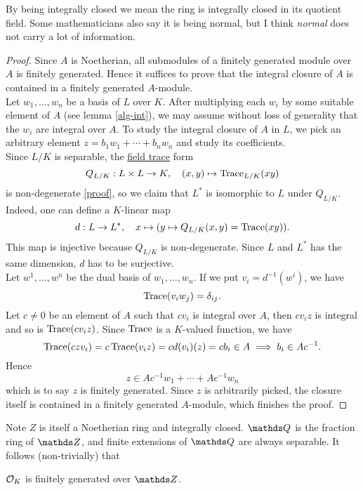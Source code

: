 			By being integrally closed we mean the ring is integrally closed in its quotient field. Some mathematicians also say it is being normal, but I think \textit{normal} does not carry a lot of information.
			
			\begin{proof}
				Since $A$ is Noetherian, all submodules of a finitely generated module over $A$ is finitely generated. Hence it suffices to prove that the integral closure of $A$ is contained in a finitely generated $A$-module.\\
				Let $w_1,\dots,w_n$ be a basis of $L$ over $K$. After multiplying each $w_i$ by some suitable element of $A$ (see lemma \ref{alg-int}), we may assume without loss of generality that the $w_i$ are integral over $A$. To study the integral closure of $A$ in $L$, we pick an arbitrary element $z = b_1w_1+\cdots+b_nw_n$ and study its coefficients. \\
				Since $L/K$ is separable, the \href{https://stacks.math.columbia.edu/tag/0BIF}{field trace} form
				\[
					Q_{L/K}:L \times L \to K, \quad (x,y) \mapsto \operatorname{Trace}_{L/K}(xy)
				\]
				is non-degenerate  \href{https://stacks.math.columbia.edu/tag/0BIL}{[proof]}, so we claim that $L^\ast$ is isomorphic to $L$ under $Q_{L/K}$. Indeed, one can define a $K$-linear map
				\[
					d:L \to L^\ast, \quad x \mapsto (y \mapsto Q_{L/K}(x,y)=\operatorname{Trace}(xy)).
				\]
				This map is injective because $Q_{L/K}$ is non-degenerate. Since $L$ and $L^\ast$ has the same dimension, $d$ has to be surjective.\\
				Let $w^1,\dots,w^n$ be the dual basis of $w_1,\dots,w_n$. If we put $v_i=d^{-1}(w^i)$, we have
				\[
					\operatorname{Trace}(v_i w_j) = \delta_{ij}.
				\]
				Let $c \ne 0$ be an element of $A$ such that $cv_i$ is integral over $A$, then $cv_iz$ is integral and so is $\operatorname{Trace}(cv_iz)$. Since $\operatorname{Trace}$ is a $K$-valued function, we have
				\[
					\operatorname{Trace}(czv_i)=c\operatorname{Trace}(v_iz)=c d(v_i)(z) = cb_i \in A \implies b_i \in Ac^{-1}.
				\]
				Hence
				\[
					z \in Ac^{-1}w_1+\cdots+Ac^{-1}w_n
				\]
				which is to say $z$ is finitely generated. Since $z$ is arbitrarily picked, the closure itself is contained in a finitely generated $A$-module, which finishes the proof. 
			\end{proof}
			Note $Z$ is itself a Noetherian ring and integrally closed. $\Q$ is the fraction ring of $\Z$, and finite extensions of $\Q$ are always separable. It follows (non-trivially) that
			\begin{corollary}
				$\mathcal{O}_K$ is finitely generated over $\Z$.
			\end{corollary}
			
